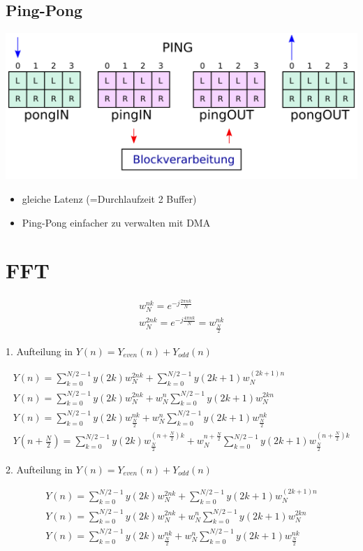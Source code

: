 \documentclass[10pt,a4paper]{article}
\begin{document}
\subsection{Ping-Pong}
  \begin{center}
      \includegraphics[width=.35\textwidth]{./img/pingpong.png}
  \end{center}
  \begin{itemize}
    \item gleiche Latenz (=Durchlaufzeit 2 Buffer)
    \item Ping-Pong einfacher zu verwalten mit DMA
  \end{itemize}
\section{FFT}
  \begin{mdframed}[style=exercise]
    \begin{align}
        w_N^{nk}=e^{-j\frac{2\pi nk}{N}}\\
        w_N^{2nk}=e^{-j\frac{4\pi nk}{N}}=w_{\frac{N}{2}}^{nk}
    \end{align}
  \end{mdframed}
  1. Aufteilung in $Y(n) = Y_{even}(n)+Y_{odd}(n)$
  \begin{mdframed}[style=exercise,font=\scriptsize]
    \begin{align}
        Y(n)=\sum_{k=0}^{N/2-1} y(2k)w_N^{2nk}+\sum_{k=0}^{N/2-1} y(2k+1)w_N^{(2k+1)n}\\
        Y(n)=\sum_{k=0}^{N/2-1} y(2k)w_N^{2nk}+w_N^{n}\sum_{k=0}^{N/2-1} y(2k+1)w_N^{2kn}\\
        Y(n)=\sum_{k=0}^{N/2-1} y(2k)w_{\frac{N}{2}}^{nk}+w_N^{n}\sum_{k=0}^{N/2-1} y(2k+1)w_{\frac{N}{2}}^{nk}\\
        Y(n+\frac{N}{2})=\sum_{k=0}^{N/2-1} y(2k)w_{\frac{N}{2}}^{(n+\frac{N}{2})k}+w_N^{n+\frac{N}{2}}\sum_{k=0}^{N/2-1} y(2k+1)w_{\frac{N}{2}}^{(n+\frac{N}{2})k}
    \end{align}
  \end{mdframed}
  2. Aufteilung in $Y(n) = Y_{even}(n)+Y_{odd}(n)$
  \begin{mdframed}[style=exercise]
    \begin{align}
        Y(n)=\sum_{k=0}^{N/2-1} y(2k)w_N^{2nk}+\sum_{k=0}^{N/2-1} y(2k+1)w_N^{(2k+1)n}\\
        Y(n)=\sum_{k=0}^{N/2-1} y(2k)w_N^{2nk}+w_N^{n}\sum_{k=0}^{N/2-1} y(2k+1)w_N^{2kn}\\
        Y(n)=\sum_{k=0}^{N/2-1} y(2k)w_{\frac{N}{2}}^{nk}+w_N^{n}\sum_{k=0}^{N/2-1} y(2k+1)w_{\frac{N}{2}}^{nk}
    \end{align}
  \end{mdframed}
\end{document}
